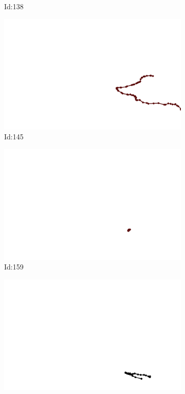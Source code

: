 \documentclass[12pt,twoside]{report}
\begin{document}
\begin{figure}
\begin{subfigure}[b]{0.20\textwidth}
\caption{Id:138}
\end{subfigure}
\begin{subfigure}[b]{0.20\textwidth}
\centering
\includegraphics[width=\textwidth]{../trajectories/145.png}
\caption{Id:145}
\end{subfigure}
\begin{subfigure}[b]{0.20\textwidth}
\centering
\includegraphics[width=\textwidth]{../trajectories/159.png}
\caption{Id:159}
\end{subfigure}
\begin{subfigure}[b]{0.20\textwidth}
\centering
\includegraphics[width=\textwidth]{../trajectories/175.png}

\end{subfigure}
\end{figure}
\end{document}
